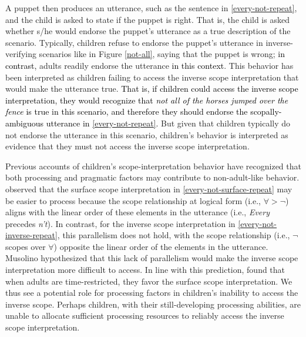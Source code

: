 \documentclass[cm]{glossa}
\newcommand{\lp}[1]{\textcolor{black}{#1}} %
\begin{document}
A puppet then produces an utterance, such as the sentence in \ref{every-not-repeat}, and the child is asked to state if the puppet is right. That is, the child is asked  whether s/he would endorse the puppet's utterance as a true description of the scenario. Typically, children  refuse to endorse the puppet's utterance in inverse-verifying scenarios like in Figure \ref{not-all}, saying that the puppet is wrong; \lp{in contrast,} adults readily endorse the utterance \lp{in this context}. This behavior has been interpreted as children failing to access the inverse scope interpretation that would make the utterance true. 
\lp{That is, if children could access the inverse scope interpretation, they would recognize that \emph{not all of the horses jumped over the fence} is true in this scenario, and therefore they should endorse the scopally-ambiguous utterance in \ref{every-not-repeat}.} But given that children typically do not endorse the utterance in this scenario, children's behavior is interpreted as evidence that they must not access the inverse scope interpretation.

Previous accounts of children's scope-interpretation behavior have recognized that both processing and pragmatic factors may contribute to non-adult-like behavior. \cite{musolino1998,musolino2006structure} observed that the surface scope interpretation in \ref{every-not-surface-repeat} may be easier to process because the scope relationship at logical form (i.e., $\forall > \neg$) aligns with the  linear order of these elements in the utterance (i.e., \textit{Every} precedes \textit{n't}). In contrast, for the inverse scope interpretation in \ref{every-not-inverse-repeat}, this parallelism does not hold,  with the scope relationship (i.e., $\neg$ scopes over $\forall$) opposite the linear order of the elements in the utterance. Musolino hypothesized that this lack of parallelism would make the inverse scope interpretation more difficult to access. In line with this prediction, \cite{conroyetal2008} found that when adults are time-restricted, they favor the surface scope interpretation. We thus see a potential role for processing factors in children's inability to access the inverse scope. Perhaps children, with their still-developing processing abilities, are unable to allocate sufficient processing resources to reliably access the inverse scope interpretation.
\end{document}
